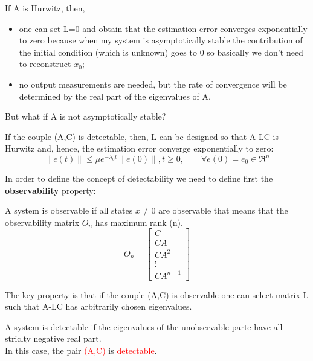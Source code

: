If A is Hurwitz, then,
\begin{itemize}
	\item one can set L=0 and obtain that the estimation error converges exponentially to zero because when my system is asymptotically stable the contribution of the initial condition (which is unknown) goes to 0 so basically we don't need to reconstruct $x_0$;
	\item no output measurements are needed, but the rate of convergence will be determined by the real part of the eigenvalues of A.
\end{itemize}
But what if A is not asymptotically stable?
\begin{thm}
	If the couple (A,C) is detectable, then, L can be designed so that A-LC is Hurwitz and, hence, the estimation error converge exponentially to zero:
	\[
	\|e(t)\| \le \mu e^{-\lambda_0t}\|e(0)\|, t\ge 0, \qquad \forall e(0)=e_0 \in \Re^n
	\]
\end{thm}
In order to define the concept of detectability we need to define first the \textbf{observability} property:
\begin{defn}
	A system is observable if all states $x\neq0$ are observable that means that the observability matrix $O_n$ has maximum rank (n).
	\[
	O_n=\begin{bmatrix} 
		C \\
		CA\\
		CA^2\\
		\vdots\\ 
		CA^{n-1}
    \end{bmatrix}
	\]
\end{defn}
The key property is that if the couple (A,C) is observable one can select matrix L such that A-LC has arbitrarily chosen eigenvalues.

\begin{defn}
	A system is detectable if the eigenvalues of the unobservable parte have all striclty negative real part.\\
	In this case, the pair \textcolor{red}{(A,C)} is \textcolor{red}{detectable}.
\end{defn}
